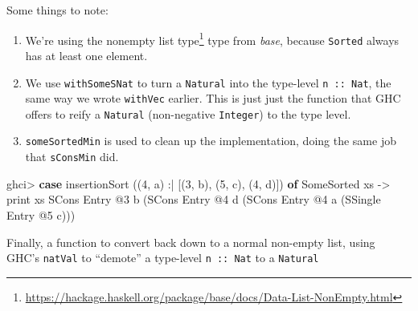 \documentclass[]{article}
\newenvironment{Shaded}{}{}
\newcommand{\CharTok}[1]{\textcolor[rgb]{0.25,0.44,0.63}{#1}}
\newcommand{\DataTypeTok}[1]{\textcolor[rgb]{0.56,0.13,0.00}{#1}}
\newcommand{\DecValTok}[1]{\textcolor[rgb]{0.25,0.63,0.44}{#1}}
\newcommand{\FunctionTok}[1]{\textcolor[rgb]{0.02,0.16,0.49}{#1}}
\newcommand{\KeywordTok}[1]{\textcolor[rgb]{0.00,0.44,0.13}{\textbf{#1}}}
\newcommand{\NormalTok}[1]{#1}
\newcommand{\OperatorTok}[1]{\textcolor[rgb]{0.40,0.40,0.40}{#1}}
\newcommand{\OtherTok}[1]{\textcolor[rgb]{0.00,0.44,0.13}{#1}}
\renewcommand{\href}[2]{#2\footnote{\url{#1}}}
\begin{document}
Some things to note:

\begin{enumerate}
\def\labelenumi{\arabic{enumi}.}
\tightlist
\item
  We're using the
  \href{https://hackage.haskell.org/package/base/docs/Data-List-NonEmpty.html}{nonempty
  list type} type from \emph{base}, because \texttt{Sorted} always has at least
  one element.
\item
  We use \texttt{withSomeSNat} to turn a \texttt{Natural} into the type-level
  \texttt{n\ ::\ Nat}, the same way we wrote \texttt{withVec} earlier. This is
  just just the function that GHC offers to reify a \texttt{Natural}
  (non-negative \texttt{Integer}) to the type level.
\item
  \texttt{someSortedMin} is used to clean up the implementation, doing the same
  job that \texttt{sConsMin} did.
\end{enumerate}

\begin{Shaded}
\begin{Highlighting}[]
\NormalTok{ghci}\OperatorTok{\textgreater{}} \KeywordTok{case}\NormalTok{ insertionSort ((}\DecValTok{4}\NormalTok{, }\CharTok{\textquotesingle{}a\textquotesingle{}}\NormalTok{) }\OperatorTok{:|}\NormalTok{ [(}\DecValTok{3}\NormalTok{, }\CharTok{\textquotesingle{}b\textquotesingle{}}\NormalTok{), (}\DecValTok{5}\NormalTok{, }\CharTok{\textquotesingle{}c\textquotesingle{}}\NormalTok{), (}\DecValTok{4}\NormalTok{, }\CharTok{\textquotesingle{}d\textquotesingle{}}\NormalTok{)]) }\KeywordTok{of}
          \DataTypeTok{SomeSorted}\NormalTok{ xs }\OtherTok{{-}\textgreater{}} \FunctionTok{print}\NormalTok{ xs}
\DataTypeTok{SCons} \DataTypeTok{Entry} \OperatorTok{@}\DecValTok{3} \CharTok{\textquotesingle{}b\textquotesingle{}}\NormalTok{ (}\DataTypeTok{SCons} \DataTypeTok{Entry} \OperatorTok{@}\DecValTok{4} \CharTok{\textquotesingle{}d\textquotesingle{}}\NormalTok{ (}\DataTypeTok{SCons} \DataTypeTok{Entry} \OperatorTok{@}\DecValTok{4} \CharTok{\textquotesingle{}a\textquotesingle{}}\NormalTok{ (}\DataTypeTok{SSingle} \DataTypeTok{Entry} \OperatorTok{@}\DecValTok{5} \CharTok{\textquotesingle{}c\textquotesingle{}}\NormalTok{)))}
\end{Highlighting}
\end{Shaded}

Finally, a function to convert back down to a normal non-empty list, using GHC's
\texttt{natVal} to ``demote'' a type-level \texttt{n\ ::\ Nat} to a
\texttt{Natural}
\end{document}
